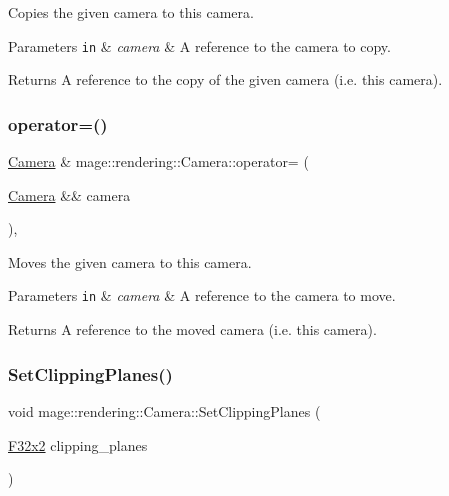 Copies the given camera to this camera.


\begin{DoxyParams}[1]{Parameters}
\mbox{\tt in}  & {\em camera} & A reference to the camera to copy. \\
\hline
\end{DoxyParams}
\begin{DoxyReturn}{Returns}
A reference to the copy of the given camera (i.\+e. this camera). 
\end{DoxyReturn}
\hypertarget{classmage_1_1rendering_1_1_camera_a61b594df300888d8d442855d18b871a3}{}\label{classmage_1_1rendering_1_1_camera_a61b594df300888d8d442855d18b871a3} 
\subsubsection{\texorpdfstring{operator=()}{operator=()}\hspace{0.1cm}{\footnotesize\ttfamily [2/2]}}
{\footnotesize\ttfamily \hyperlink{classmage_1_1rendering_1_1_camera}{Camera} \& mage\+::rendering\+::\+Camera\+::operator= (\begin{DoxyParamCaption}\item[{\hyperlink{classmage_1_1rendering_1_1_camera}{Camera} \&\&}]{camera }\end{DoxyParamCaption})\hspace{0.3cm}{\ttfamily [default]}, {\ttfamily [noexcept]}}

Moves the given camera to this camera.


\begin{DoxyParams}[1]{Parameters}
\mbox{\tt in}  & {\em camera} & A reference to the camera to move. \\
\hline
\end{DoxyParams}
\begin{DoxyReturn}{Returns}
A reference to the moved camera (i.\+e. this camera). 
\end{DoxyReturn}
\hypertarget{classmage_1_1rendering_1_1_camera_afc95f8de701649af5b614a57c1c06e9a}{}\label{classmage_1_1rendering_1_1_camera_afc95f8de701649af5b614a57c1c06e9a} 
\subsubsection{\texorpdfstring{Set\+Clipping\+Planes()}{SetClippingPlanes()}}
{\footnotesize\ttfamily void mage\+::rendering\+::\+Camera\+::\+Set\+Clipping\+Planes (\begin{DoxyParamCaption}\item[{\hyperlink{namespacemage_aa87237ad091f5cd7da612b8523fc108f}{F32x2}}]{clipping\+\_\+planes }\end{DoxyParamCaption})\hspace{0.3cm}{\ttfamily [noexcept]}}

